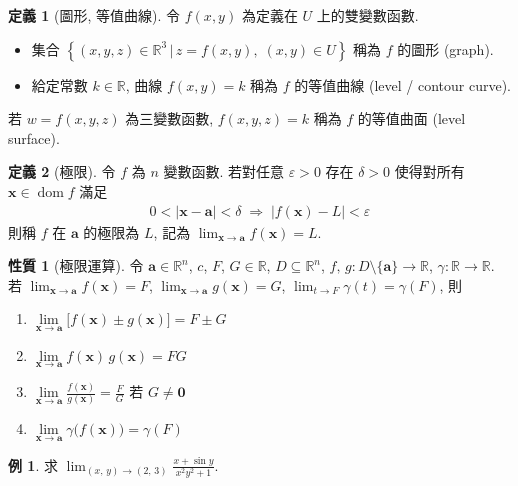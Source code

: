 \documentclass[12pt]{extarticle}
\newcommand{\ds}{\displaystyle}
\newcommand{\ie}{\;\Longrightarrow\;}
\DeclareMathOperator*{\dom}{dom}
\theoremstyle{definition}
\newtheorem*{dfn}{定義}
\newtheorem*{prp}{性質}
\newtheorem*{ex}{例}
\newcommand{\va}{\mathbf{a}}
\newcommand{\vb}{\mathbf{b}}
\newcommand{\vx}{\mathbf{x}}
\newcommand{\vX}{\mathbf{X}}
\newcommand{\vy}{\mathbf{y}}
\newcommand{\vZero}{\mathbf{0}}
\newcommand{\ga}{\gamma}
\newcommand{\bbbr}{\mathbb{R}}
\begin{document}
\begin{dfn}[圖形, 等值曲線]
  令 $f(x, y)$ 為定義在 $U$ 上的雙變數函數. 
  \begin{itemize}\setlength{\itemsep}{0pt}
    \item 集合 $\ds\left\{(x, y, z)\in\mathbb{R}^3\,|\,z = f(x, y),\;(x, y)\in U\right\}$ 稱為 $f$ 的圖形 (graph). 
    \item 給定常數 $k\in\mathbb{R}$, 曲線 $f(x, y) = k$ 稱為 $f$ 的等值曲線 (level / contour curve). 
  \end{itemize}
  若 $w = f(x, y, z)$ 為三變數函數, $f(x, y, z) = k$ 稱為 $f$ 的等值曲面 (level surface). 
\end{dfn}

\begin{dfn}[極限] 令 $f$ 為 $n$ 變數函數. 若對任意 $\varepsilon > 0$ 存在 $\delta > 0$ 使得對所有 $\vx\in\dom f$ 滿足 
  \begin{align*}
    0 < |\vx - \va| < \delta \ie |f(\vx) - L| < \varepsilon
  \end{align*}
  則稱 $f$ 在 $\va$ 的極限為 $L$, 記為 $\ds\lim_{\vx\to\va}f(\vx) = L$. 
\end{dfn}

\begin{prp}[極限運算]
  令 $\va\in\bbbr^n$, $c$, $F$, $G\in\bbbr$, $\ds D\subseteq\bbbr^n$, $f,\,g: D\setminus\{\va\}\to\bbbr$, $\ga:\bbbr\to\bbbr$.  
若 $\ds\lim_{\vx\to\va} f(\vx) = F$, $\ds\lim_{\vx\to\va} g(\vx) = G$, $\ds\lim_{t\to F}\ga(t) = \ga(F)$, 則
  \begin{multicols}{3}
    \begin{enumerate}\setlength{\itemsep}{0pt}
      \item $\ds\lim\limits_{\vx\to\va}\big[f(\vx)\pm g(\vx)\big] = F \pm G$
      \item $\ds\lim\limits_{\vx\to\va} f(\vx)\,g(\vx) = FG$
      \item $\ds\lim\limits_{\vx\to\va} \frac{f(\vx)}{g(\vx)} = \frac{F}{G}$ 若 $G\ne\vZero$
      \item $\ds\lim\limits_{\vx\to \va} \ga\big(f(\vx)\big) = \ga(F)$
    \end{enumerate}
  \end{multicols}
\end{prp}

\begin{ex} 
  求 $\ds\lim_{(x,\,y)\to(2,\,3)}\frac{x + \sin y}{x^2 y^2 + 1}$. 
\end{ex}
\end{document}
